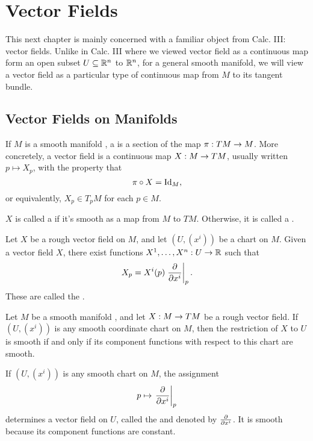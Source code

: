 \newpage\setcounter{section}{7}
\section{Vector Fields}

This next chapter is mainly concerned with a familiar object from Calc. III: vector fields. Unlike in Calc. III where we viewed vector field as a continuous map form an open subset $U\subseteq \mathbb{R}^n$ to $\mathbb{R}^n$, for a general smooth manifold, we will view a vector field as a particular type of continuous map from $M$ to its tangent bundle.

\subsection{Vector Fields on Manifolds}\nl

\dfn If $M$ is a smooth manifold \wowob, a  is a section of the map $\pi:TM\rightarrow M$. More concretely, a vector field is a continuous map $X:M\rightarrow TM$, usually written $p\mapsto X_p$, with the property that
\[\pi\circ X = \text{Id}_M,\]
or equivalently, $X_p\in T_pM$ for each $p\in M$.

\dfn $X$ is called a  if it's smooth as a map from $M$ to $TM$. Otherwise, it is called a .

\dfn Let $X$ be a rough vector field on $M$, and let $(U, (x^i))$ be a chart on $M$. Given a vector field $X$, there exist functions $X^1,\ldots,X^n:U\rightarrow \mathbb{R}$ such that
\[X_p = X^i(p)\left. \frac{\partial}{\partial x^i}\right|_{p}.\]
These are called the .

\begin{prop}
Let $M$ be a smooth manifold \wowob, and let $X:M\rightarrow TM$ be a rough vector field. If $(U, (x^i))$ is any smooth coordinate chart on $M$, then the restriction of $X$ to $U$ is smooth if and only if its component functions with respect to this chart are smooth.
\end{prop}

\begin{ex}
If $(U, (x^i))$ is any smooth chart on $M$, the assignment 
\[p\mapsto\left. \frac{\partial}{\partial x^i}\right|_{p}\]
determines a vector field on $U$, called the  and denoted by $\frac{\partial}{\partial x^i}$. It is smooth because its component functions are constant.
\end{ex}

\setcounter{thm}{3}

